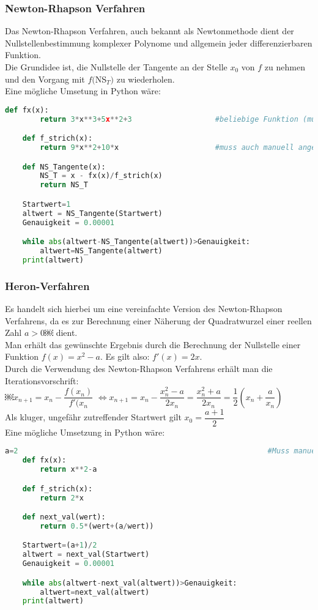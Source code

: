 \subsubsection{Newton-Rhapson Verfahren}
Das Newton-Rhapson Verfahren, auch bekannt als Newtonmethode dient der Nullstellenbestimmung komplexer Polynome und allgemein jeder differenzierbaren Funktion.\\
Die Grundidee ist, die Nullstelle der Tangente an der Stelle $x_0$ von $f$ zu nehmen und den Vorgang mit $f($NS$_T)$ zu wiederholen.\\
Eine mögliche Umsetung in Python wäre:\\
\begin{lstlisting}[language=Python]
	def fx(x):
		return 3*x**3+5x**2+3					#beliebige Funktion (muss angegeben werden)

	def f_strich(x):
		return 9*x**2+10*x						#muss auch manuell angegeben werden

	def NS_Tangente(x):
		NS_T = x - fx(x)/f_strich(x)
		return NS_T

	Startwert=1
	altwert = NS_Tangente(Startwert)
	Genauigkeit = 0.00001

	while abs(altwert-NS_Tangente(altwert))>Genauigkeit:
		altwert=NS_Tangente(altwert)
	print(altwert)

\end{lstlisting}
\subsubsection{Heron-Verfahren}
Es handelt sich hierbei um eine vereinfachte Version des Newton-Rhapson Verfahrens, da es zur Berechnung einer Näherung der Quadratwurzel einer reellen Zahl $a>0$￼ dient.\\
Man erhält das gewünschte Ergebnis durch die Berechnung der Nullstelle einer Funktion $f(x)=x^{2}-a$. Es gilt also: $f'(x)=2x$.\\
Durch die Verwendung des Newton-Rhapson Verfahrens erhält man die Iterationsvorschrift:\\
￼$x_{n+1}=x_{n}-\dfrac{f(x_{n})}{f'(x_{n}}$
$\Leftrightarrow x_{n+1}=x_{n}-\dfrac{x_{n}^{2}-a}{2x_{n}}=\dfrac{x_{n}^{2}+a}{2x_{n}}=\dfrac{1}{2}(x_{n}+\dfrac{a}{x_{n}})$\\
Als kluger, ungefähr zutreffender Startwert gilt $x_0=\dfrac{a+1}{2}$\\
Eine mögliche Umsetzung in Python wäre:\\

\begin{lstlisting}[language=Python]
	a=2															#Muss manuell angegeben werden
	def fx(x):
		return x**2-a

	def f_strich(x):
		return 2*x

	def next_val(wert):
		return 0.5*(wert+(a/wert))

	Startwert=(a+1)/2
	altwert = next_val(Startwert)
	Genauigkeit = 0.00001

	while abs(altwert-next_val(altwert))>Genauigkeit:
		altwert=next_val(altwert)
	print(altwert)
\end{lstlisting}
